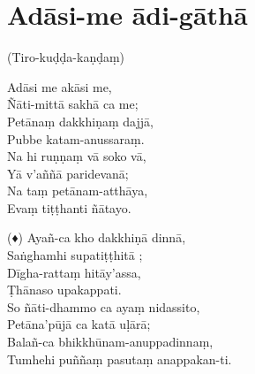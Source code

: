 \chapter{Adāsi-me ādi-gāthā}

(Tiro-kuḍḍa-kaṇḍaṃ)

Adāsi me akāsi me,\\
Ñāti-mittā sakhā ca me;\\
Petānaṃ dakkhiṇaṃ dajjā,\\
Pubbe katam-anussaraṃ.\\
Na hi ruṇṇaṃ vā soko vā,\\
Yā v’aññā paridevanā;\\
Na taṃ petānam-atthāya,\\
Evaṃ tiṭṭhanti ñātayo.

(♦) Ayañ-ca kho dakkhiṇā dinnā,\\
Saṅghamhi supatiṭṭhitā ;\\
Dīgha-rattaṃ hitāy’assa,\\
Ṭhānaso upakappati.\\
So ñāti-dhammo ca ayaṃ nidassito,\\
Petāna’pūjā ca katā uḷārā;\\
Balañ-ca bhikkhūnam-anuppadinnaṃ,\\
Tumhehi puññaṃ pasutaṃ anappakan-ti.

